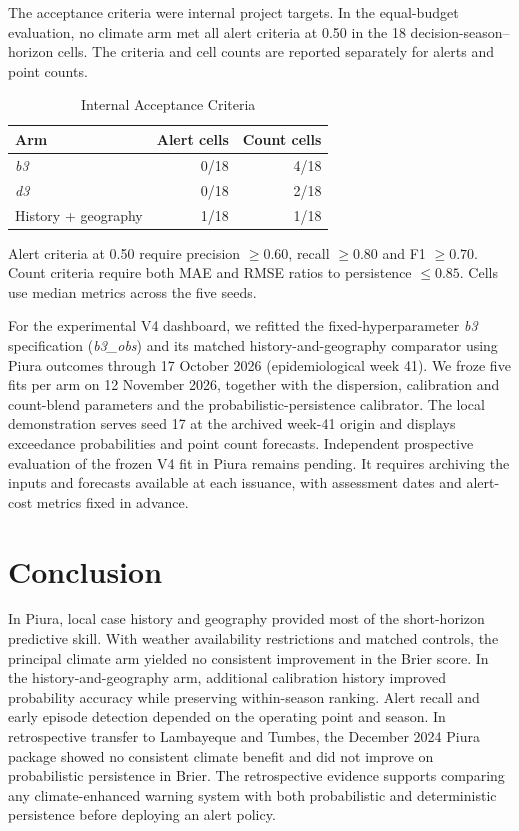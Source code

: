 \documentclass[journal]{IEEEtran}
\newcommand{\bthree}{\textit{b3}}
\newcommand{\dthree}{\textit{d3}}
\begin{document}
The acceptance criteria were internal project targets. In the equal-budget evaluation, no climate arm met all alert criteria at 0.50 in the 18 decision-season--horizon cells. The criteria and cell counts are reported separately for alerts and point counts.

\begin{table}[!t]
\caption{Internal Acceptance Criteria}
\label{tab:criteria}
\centering
\begin{tabular}{@{}lrr@{}}
\toprule
Arm & Alert cells & Count cells\\
\midrule
\bthree{} & 0/18 & 4/18\\
\dthree{} & 0/18 & 2/18\\
History + geography & 1/18 & 1/18\\
\bottomrule
\end{tabular}

\vspace{2pt}\parbox{0.9\columnwidth}{\footnotesize Alert criteria at 0.50 require precision $\geq 0.60$, recall $\geq 0.80$ and F1 $\geq 0.70$. Count criteria require both MAE and RMSE ratios to persistence $\leq 0.85$. Cells use median metrics across the five seeds.}
\end{table}

For the experimental V4 dashboard, we refitted the fixed-hyperparameter \bthree{} specification (\textit{b3\_obs}) and its matched history-and-geography comparator using Piura outcomes through 17 October 2026 (epidemiological week 41). We froze five fits per arm on 12 November 2026, together with the dispersion, calibration and count-blend parameters and the probabilistic-persistence calibrator. The local demonstration serves seed 17 at the archived week-41 origin and displays exceedance probabilities and point count forecasts. Independent prospective evaluation of the frozen V4 fit in Piura remains pending. It requires archiving the inputs and forecasts available at each issuance, with assessment dates and alert-cost metrics fixed in advance.

\section{Conclusion}
In Piura, local case history and geography provided most of the short-horizon predictive skill. With weather availability restrictions and matched controls, the principal climate arm yielded no consistent improvement in the Brier score. In the history-and-geography arm, additional calibration history improved probability accuracy while preserving within-season ranking. Alert recall and early episode detection depended on the operating point and season. In retrospective transfer to Lambayeque and Tumbes, the December 2024 Piura package showed no consistent climate benefit and did not improve on probabilistic persistence in Brier. The retrospective evidence supports comparing any climate-enhanced warning system with both probabilistic and deterministic persistence before deploying an alert policy.
\end{document}
